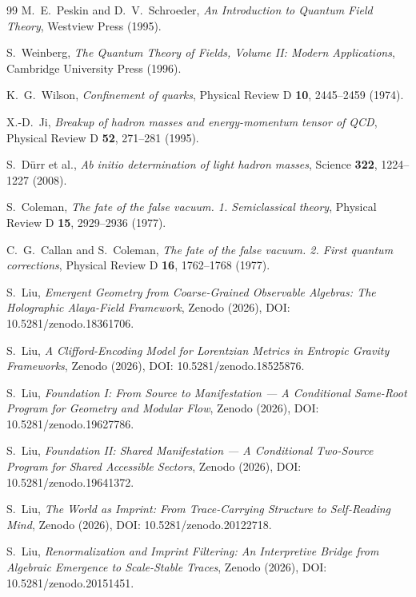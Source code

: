 \documentclass[12pt,a4paper]{article}
\theoremstyle{definition}
\theoremstyle{remark}
\begin{document}
\begin{thebibliography}{99}
M.~E.~Peskin and D.~V.~Schroeder, \emph{An Introduction to Quantum Field Theory}, Westview Press (1995).

S.~Weinberg, \emph{The Quantum Theory of Fields, Volume II: Modern Applications}, Cambridge University Press (1996).

K.~G.~Wilson, \emph{Confinement of quarks}, Physical Review D \textbf{10}, 2445--2459 (1974).

X.-D.~Ji, \emph{Breakup of hadron masses and energy-momentum tensor of QCD}, Physical Review D \textbf{52}, 271--281 (1995).

S.~D\"urr et al., \emph{Ab initio determination of light hadron masses}, Science \textbf{322}, 1224--1227 (2008).

S.~Coleman, \emph{The fate of the false vacuum. 1. Semiclassical theory}, Physical Review D \textbf{15}, 2929--2936 (1977).

C.~G.~Callan and S.~Coleman, \emph{The fate of the false vacuum. 2. First quantum corrections}, Physical Review D \textbf{16}, 1762--1768 (1977).

S.~Liu, \emph{Emergent Geometry from Coarse-Grained Observable Algebras: The Holographic Alaya-Field Framework}, Zenodo (2026), DOI: 10.5281/zenodo.18361706.

S.~Liu, \emph{A Clifford-Encoding Model for Lorentzian Metrics in Entropic Gravity Frameworks}, Zenodo (2026), DOI: 10.5281/zenodo.18525876.

S.~Liu, \emph{Foundation I: From Source to Manifestation --- A Conditional Same-Root Program for Geometry and Modular Flow}, Zenodo (2026), DOI: 10.5281/zenodo.19627786.

S.~Liu, \emph{Foundation II: Shared Manifestation --- A Conditional Two-Source Program for Shared Accessible Sectors}, Zenodo (2026), DOI: 10.5281/zenodo.19641372.

S.~Liu, \emph{The World as Imprint: From Trace-Carrying Structure to Self-Reading Mind}, Zenodo (2026), DOI: 10.5281/zenodo.20122718.

S.~Liu, \emph{Renormalization and Imprint Filtering: An Interpretive Bridge from Algebraic Emergence to Scale-Stable Traces}, Zenodo (2026), DOI: 10.5281/zenodo.20151451.

\end{thebibliography}
\end{document}

